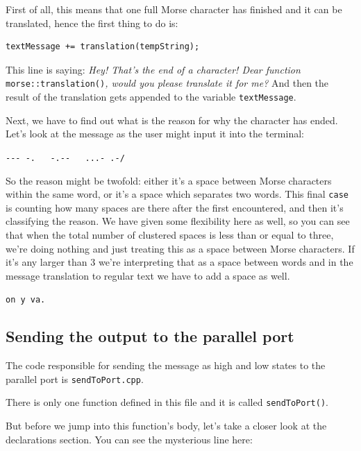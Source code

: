 \documentclass[12pt]{report}
\begin{document}
First of all, this means that one full Morse character has finished and it can be translated, hence the first thing to do is:

\begin{lstlisting}
textMessage += translation(tempString);
\end{lstlisting}

This line is saying: \textit{Hey! That's the end of a character! Dear function} \texttt{morse::translation()}\textit{, would you please translate it for me?} And then the result of the translation gets appended to the variable \verb|textMessage|.

Next, we have to find out what is the reason for why the character has ended. Let's look at the message as the user might input it into the terminal:

\begin{snugshade}
\verb|--- -.   -.--   ...- .-/|
\end{snugshade}


So the reason might be twofold: either it's a space between Morse characters within the same word, or it's a space which separates two words. This final \verb|case| is counting how many spaces are there after the first encountered, and then it's classifying the reason. We have given some flexibility here as well, so you can see that when the total number of clustered spaces is less than or equal to three, we're doing nothing and just treating this as a space between Morse characters. If it's any larger than 3 we're interpreting that as a space between words and in the message translation to regular text we have to add a space as well.

\begin{snugshade}
\verb|on y va.|
\end{snugshade}

\subsection{Sending the output to the parallel port}

The code responsible for sending the message as high and low states to the parallel port is \verb|sendToPort.cpp|.

There is only one function defined in this file and it is called \texttt{sendToPort()}.

But before we jump into this function's body, let's take a closer look at the declarations section. You can see the mysterious line here:
\end{document}
